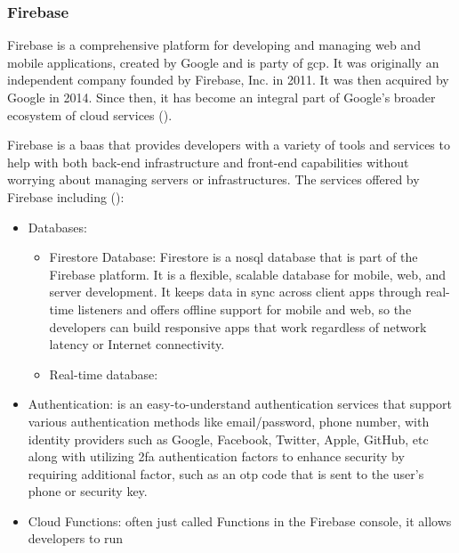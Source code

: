 \begin{multicols}{2}
      \subsubsection{Firebase}
      Firebase is a comprehensive platform for developing and managing web and mobile applications, created by
      Google and is party of \acrshort{gcp}. It was originally an independent company founded by Firebase, Inc.
      in 2011. It was then acquired by Google in 2014. Since then, it has become an integral part of Google's
      broader ecosystem of cloud services (\cite{firebase}).

      Firebase is a \acrshort{baas} that provides developers with a variety of tools and services to help with both
      back-end infrastructure and front-end capabilities without worrying about managing servers or infrastructures.
      The services offered by Firebase including (\textit{\cite{firebaseproducts}}):
      \begin{itemize}
            \item Databases:
                  \begin{itemize}
                        \item Firestore Database: Firestore is a \acrshort{nosql} database that is part of the Firebase
                              platform. It is a flexible, scalable database for mobile, web, and server development. It keeps
                              data in sync across client apps through real-time listeners and offers offline support for mobile
                              and web, so the developers can build responsive apps that work regardless of network latency or
                              Internet connectivity.
                        \item Real-time database:
                  \end{itemize}
            \item Authentication: is an easy-to-understand authentication services that support various authentication
                  methods like email/password, phone number, with identity providers such as Google, Facebook, Twitter,
                  Apple, GitHub, \acrshort{etc}
                  along with utilizing \acrshort{2fa} authentication factors to enhance security by requiring additional
                  factor, such as an \acrshort{otp} code that is sent to the user's phone or security key.
            \item Cloud Functions: often just called Functions in the Firebase console, it allows developers to run

\end{itemize}
\end{multicols}
